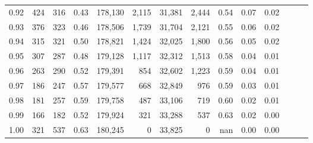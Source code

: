 \begin{tabular}{rrrrrrrrrrrrrr}
0.92 &    424 &  316 &  0.43 &  178,130 &    2,115 &  31,381 &   2,444 &  0.54 &  0.07 &      0.02 \\
0.93 &    376 &  323 &  0.46 &  178,506 &    1,739 &  31,704 &   2,121 &  0.55 &  0.06 &      0.02 \\
0.94 &    315 &  321 &  0.50 &  178,821 &    1,424 &  32,025 &   1,800 &  0.56 &  0.05 &      0.02 \\
0.95 &    307 &  287 &  0.48 &  179,128 &    1,117 &  32,312 &   1,513 &  0.58 &  0.04 &      0.01 \\
0.96 &    263 &  290 &  0.52 &  179,391 &      854 &  32,602 &   1,223 &  0.59 &  0.04 &      0.01 \\
0.97 &    186 &  247 &  0.57 &  179,577 &      668 &  32,849 &     976 &  0.59 &  0.03 &      0.01 \\
0.98 &    181 &  257 &  0.59 &  179,758 &      487 &  33,106 &     719 &  0.60 &  0.02 &      0.01 \\
0.99 &    166 &  182 &  0.52 &  179,924 &      321 &  33,288 &     537 &  0.63 &  0.02 &      0.00 \\
1.00 &    321 &  537 &  0.63 &  180,245 &        0 &  33,825 &       0 &   nan &  0.00 &      0.00 \\
\bottomrule
\end{tabular}
